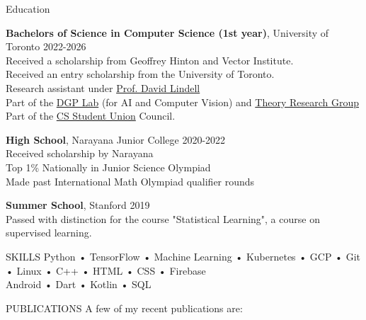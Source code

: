 \documentclass{resume} %
\begin{document}
\begin{rSection}{Education}

{\bf Bachelors of Science in Computer Science (1st year)}, University of Toronto \hfill {2022-2026}\\
Received a scholarship from Geoffrey Hinton and Vector Institute.\\
Received an entry scholarship from the University of Toronto.\\
Research assistant under \href{https://davidlindell.com/}{Prof. David Lindell}\\
Part of the \href{https://www.dgp.toronto.edu/}{DGP Lab} (for AI and Computer Vision) and \href{https://www.cs.toronto.edu/theory/}{Theory Research Group}\\
Part of the \href{http://cssu.ca/}{CS Student Union} Council.

{\bf High School}, Narayana Junior College \hfill {2020-2022}\\
Received scholarship by Narayana\\
Top 1\% Nationally in Junior Science Olympiad\\
Made past International Math Olympiad qualifier rounds

{\bf Summer School}, Stanford \hfill {2019}\\
Passed with distinction for the course "Statistical Learning", a course on supervised learning.
\end{rSection}

\begin{rSection}{SKILLS}
Python • TensorFlow • Machine Learning • Kubernetes • GCP • Git • Linux • C++ • HTML • CSS • Firebase\\
Android • Dart • Kotlin • SQL
\end{rSection}

\begin{rSection}{PUBLICATIONS}
A few of my recent publications are:
\nocite{*}

\end{rSection}
\end{document}
